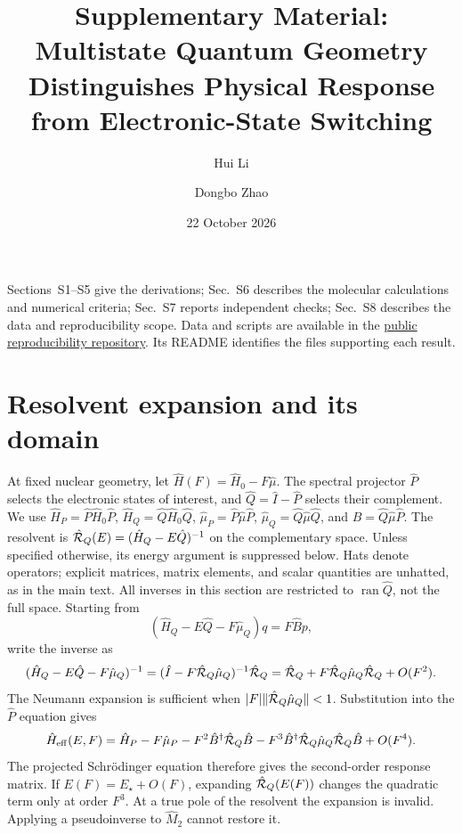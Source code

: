 \documentclass[aip,jcp,amsmath,amssymb,preprint,floatfix]{revtex4-1}
\begin{document}
\title{Supplementary Material: Multistate Quantum Geometry Distinguishes Physical Response from Electronic-State Switching}
\author{Hui Li}\author{Dongbo Zhao}
\date{22 October 2026}\maketitle

\noindent
Sections~S1--S5 give the derivations; Sec.~S6 describes the molecular
calculations and numerical criteria; Sec.~S7 reports independent checks;
Sec.~S8 describes the data and reproducibility scope. Data and scripts are
available in the
\href{https://github.com/zzdbl520/quantum-geometry-response-data/tree/main/multistate}{public reproducibility repository}.
Its README identifies the files supporting each result.

\section{Resolvent expansion and its domain}\label{sec:resolvent}
At fixed nuclear geometry, let $\hat H(F)=\hat H_0-F\hat\mu$.
The spectral projector $\hat P$ selects the electronic states of interest,
and $\hat Q=\hat I-\hat P$ selects their complement. We use
$\hat H_P=\hat P\hat H_0\hat P$, $\hat H_Q=\hat Q\hat H_0\hat Q$,
$\hat\mu_P=\hat P\hat\mu\hat P$, $\hat\mu_Q=\hat Q\hat\mu\hat Q$,
and $\hat B=\hat Q\hat\mu\hat P$. The resolvent is
$\hat{\mathcal R}_Q(E)=(\hat H_Q-E\hat Q)^{-1}$ on the complementary space.
Unless specified otherwise, its energy argument is suppressed below.
Hats denote operators; explicit matrices, matrix elements, and scalar quantities are unhatted, as in the main text. All inverses in this section are restricted to $\operatorname{ran}\hat{Q}$, not the full space. Starting from
\begin{equation}
(\hat{H}_Q-E\hat{Q}-F\hat{\mu}_Q)q=F\hat{B}p,
\end{equation}
write the inverse as
\begin{equation}
(\hat{H}_Q-E\hat{Q}-F\hat{\mu}_Q)^{-1}
=(\hat{I}-F\hat{\mathcal R}_Q\hat{\mu}_Q)^{-1}\hat{\mathcal R}_Q
=\hat{\mathcal R}_Q+F\hat{\mathcal R}_Q\hat{\mu}_Q\hat{\mathcal R}_Q+O(F^2).
\end{equation}
The Neumann expansion is sufficient when $|F|\|\hat{\mathcal R}_Q\hat{\mu}_Q\|<1$. Substitution into the $\hat{P}$ equation gives
\begin{equation}
\hat{H}_{\mathrm{eff}}(E,F)=\hat{H}_P-F\hat{\mu}_P-F^2\hat{B}^\dagger\hat{\mathcal R}_Q \hat{B}
-F^3\hat{B}^\dagger\hat{\mathcal R}_Q\hat{\mu}_Q\hat{\mathcal R}_Q \hat{B}+O(F^4).
\end{equation}
The projected Schr{\"o}dinger equation therefore gives the second-order response matrix.\cite{Lowdin1951,Feshbach1962} If $E(F)=E_\star+O(F)$, expanding $\hat{\mathcal R}_Q(E(F))$ changes the quadratic term only at order $F^3$. At a true pole of the resolvent the expansion is invalid. Applying a pseudoinverse to $\hat{M}_2$ cannot restore it.
\end{document}
